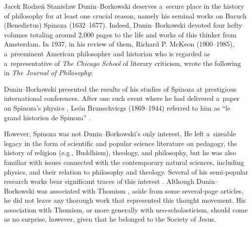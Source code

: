 \begin{artengenv}{Jacek Rodzeń}
Stanisław Dunin–Borkowski deserves a~secure place in the history of philosophy for at least one crucial reason, namely his seminal works on Baruch (Benedictus) Spinoza (1632–1677). Indeed, Dunin–Borkowski devoted four hefty volumes totaling around 2,000 pages to the life and works of this thinker from Amsterdam. In 1937, in his review of them, Richard P. McKeon (1900–1985), a~preeminent American philosopher and historian who is regarded as a~representative of \textit{The Chicago School} of literary criticism, wrote the following in \textit{The Journal of Philosophy}:

Dunin–Borkowski presented the results of his studies of Spinoza at prestigious international conferences. After one such event where he had delivered a~paper on Spinoza's physics
\parencite[][]{dunin-borkowski_aus_1933}, %
 León Brunschvicgs (1869–1944) referred to him as ``le grand historien de Spinoza'' 
\parencite[][p.427]{brunschvicg_septimana_1934}.%


However, Spinoza was not Dunin–Borkowski's only interest. He left a~sizeable legacy in the form of scientific and popular science literature on pedagogy, the history of religion (e.g., Buddhism), theology, and philosophy, but he was also familiar with issues connected with the contemporary natural sciences, including physics, and their relation to philosophy and theology. Several of his semi-popular research works bear significant traces of this interest
\parencites[cf.][]{dunin-borkowski_popularer_1898}[][]{dunin-borkowski_wissenschaft_1911}. %
 Although Dunin–Borkowski was associated with Thomism 
\parencites[][]{dunin-borkowski_auf_1921}[][]{dunin-borkowski_neue_1921}[also][p.141]{siwek_stanislaw_1935}[][pp.306–307]{siwek_spinoza_1938}, %
 aside from some several-page articles, he did not leave any thorough work that represented this thought movement. His association with Thomism, or more generally with neo-scholasticism, should come as no surprise, however, given that he belonged to the Society of Jesus.


\end{artengenv}
